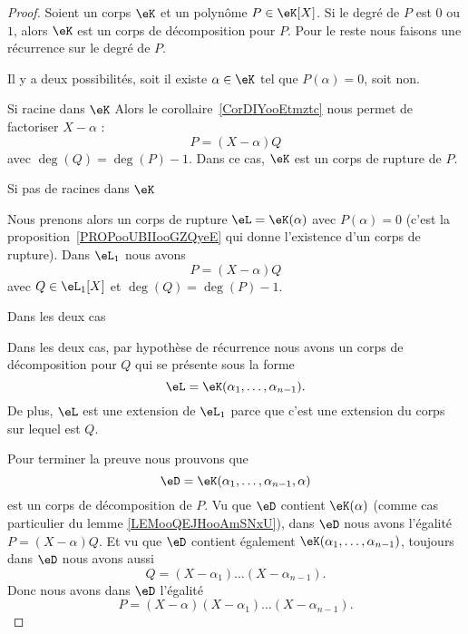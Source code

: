 \begin{proof}
    Soient un corps \( \eK\) et un polynôme \( P\in \eK[X]\). Si le degré de \( P\) est \( 0\) ou \( 1\), alors \( \eK\) est un corps de décomposition pour \( P\). Pour le reste nous faisons une récurrence sur le degré de \( P\).

    Il y a deux possibilités, soit il existe \( \alpha\in \eK\) tel que \( P(\alpha)=0\), soit non.

    \begin{subproof}
        \item[Si racine dans \( \eK\)]
            Alors le corollaire~\ref{CorDIYooEtmztc} nous permet de factoriser \( X-\alpha\) :
            \begin{equation}
                P=(X-\alpha)Q
            \end{equation}
            avec \( \deg(Q)=\deg(P)-1\). Dans ce cas, \( \eK\) est un corps de rupture de \( P\).

        \item[Si pas de racines dans \( \eK\)]

            Nous prenons alors un corps de rupture \( \eL=\eK(\alpha)\) avec \( P(\alpha)=0\) (c'est la proposition~\ref{PROPooUBIIooGZQyeE} qui donne l'existence d'un corps de rupture). Dans \( \eL_1\) nous avons
            \begin{equation}
                P=(X-\alpha)Q
            \end{equation}
            avec \( Q\in \eL_1[X]\) et \( \deg(Q)=\deg(P)-1\).

        \item[Dans les deux cas]

            Dans les deux cas, par hypothèse de récurrence nous avons un corps de décomposition pour \( Q\) qui se présente sous la forme
            \begin{equation}
                \eL=\eK(\alpha_1,\ldots, \alpha_{n-1}).
            \end{equation}
            De plus, \( \eL\) est une extension de \( \eL_1\) parce que c'est une extension du corps sur lequel est \( Q\).

    \end{subproof}
    Pour terminer la preuve nous prouvons que
    \begin{equation}
        \eD=\eK(\alpha_1,\ldots, \alpha_{n-1},\alpha)
    \end{equation}
    est un corps de décomposition de \( P\). Vu que \( \eD\) contient \( \eK(\alpha)\) (comme cas particulier du lemme \ref{LEMooQEJHooAmSNxU}), dans \( \eD\) nous avons l'égalité \( P=(X-\alpha)Q\). Et vu que \( \eD\) contient également \( \eK(\alpha_1,\ldots, \alpha_{n-1})\), toujours dans \( \eD\) nous avons aussi
    \begin{equation}
         Q=(X-\alpha_1)\ldots(X-\alpha_{n-1}).
    \end{equation}
    Donc nous avons dans \( \eD\) l'égalité
    \begin{equation}
        P=(X-\alpha)(X-\alpha_1)\ldots (X-\alpha_{n-1}).
    \end{equation}
\end{proof}

